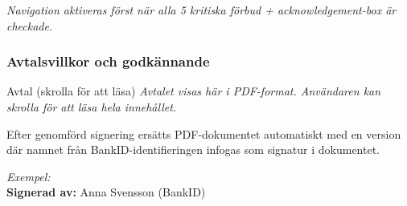\documentclass[10pt]{beamer}
\begin{document}
\begin{frame}[label=skyldigheter]
  \vspace{0.3cm}
  \textit{Navigation aktiveras först när alla 5 kritiska förbud + acknowledgement-box är checkade.}
  
  \vspace{0.5cm}
  \begin{flushright}
  \end{flushright}
\end{frame}

\begin{frame}[fragile]
  \frametitle{Avtalsvillkor och godkännande}

  \begin{block}{Avtal (skrolla för att läsa)}
    \vspace{0.2cm}
    \textit{\footnotesize Avtalet visas här i PDF-format. Användaren kan skrolla för att läsa hela innehållet.}
    \vspace{0.4cm}
  \end{block}

  \vspace{0.4cm}
  \begin{center}
  \end{center}

  \vspace{0.6cm}
  \small
  Efter genomförd signering ersätts PDF-dokumentet automatiskt med en version där
  namnet från BankID-identifieringen infogas som signatur i dokumentet.
  \medskip

  \textit{Exempel:}\\
  \textbf{Signerad av:} Anna Svensson (BankID)

\end{frame}
\end{document}
